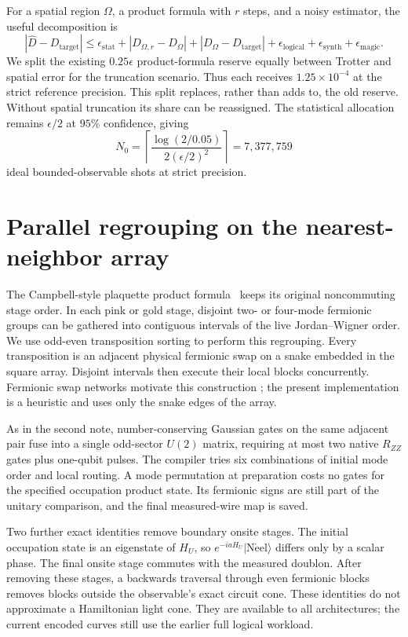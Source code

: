 \documentclass[11pt]{article}
\newcommand{\eps}{\epsilon}
\begin{document}
For a spatial region $\Omega$, a product formula with $r$ steps, and a noisy
estimator, the useful decomposition is
\begin{equation}\label{eq:budget}
 |\widehat D-D_{\mathrm{target}}|
 \leq \eps_{\mathrm{stat}}+
 |D_{\Omega,r}-D_\Omega|+
 |D_\Omega-D_{\mathrm{target}}|+
 \eps_{\mathrm{logical}}+\eps_{\mathrm{synth}}+\eps_{\mathrm{magic}}.
\end{equation}
We split the existing $0.25\eps$ product-formula reserve equally between
Trotter and spatial error for the truncation scenario. Thus each receives
$1.25\times10^{-4}$ at the strict reference precision. This split replaces,
rather than adds to, the old reserve. Without spatial truncation its share
can be reassigned. The statistical allocation remains $\eps/2$ at $95\%$
confidence, giving
\begin{equation}
 N_0=\left\lceil\frac{\log(2/0.05)}{2(\eps/2)^2}\right\rceil
 =7{,}377{,}759
\end{equation}
ideal bounded-observable shots at strict precision.

\section{Parallel regrouping on the nearest-neighbor array}
The Campbell-style plaquette product formula~\cite{campbell} keeps its original
noncommuting stage order. In each pink or gold stage, disjoint two- or four-mode
fermionic groups can be gathered into contiguous intervals of the live
Jordan--Wigner order. We use odd-even transposition sorting to perform this
regrouping. Every transposition is an adjacent physical fermionic swap on a
snake embedded in the square array. Disjoint intervals then execute their
local blocks concurrently. Fermionic swap networks motivate this construction
\cite{kivlichan2018}; the present implementation is a heuristic and uses only
the snake edges of the array.

As in the second note, number-conserving Gaussian gates on the same adjacent
pair fuse into a single odd-sector $U(2)$ matrix, requiring at most two native
$R_{ZZ}$ gates plus one-qubit pulses. The compiler tries six combinations of
initial mode order and local routing. A mode permutation at preparation costs
no gates for the specified occupation product state. Its fermionic signs are
still part of the unitary comparison, and the final measured-wire map is saved.

Two further exact identities remove boundary onsite stages. The initial
occupation state is an eigenstate of $H_U$, so
$e^{-iaH_U}|\mathrm{N\acute eel}\rangle$ differs only by a scalar phase.
The final onsite stage commutes with the measured doublon. After removing
these stages, a backwards traversal through even fermionic blocks removes
blocks outside the observable's exact circuit cone. These identities do not
approximate a Hamiltonian light cone. They are available to all architectures;
the current encoded curves still use the earlier full logical workload.
\end{document}
